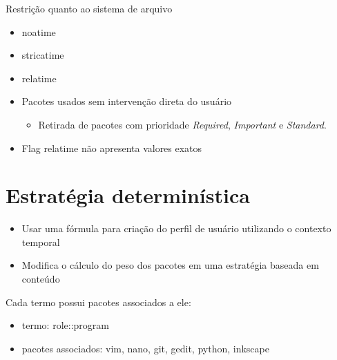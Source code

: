 \begin{frame}
    Restrição quanto ao sistema de arquivo

    \begin{itemize}
        \item noatime
        \item stricatime
        \item relatime
    \end{itemize}
\end{frame}

\begin{frame}

    \begin{itemize}
        \item Pacotes usados sem intervenção direta do usuário
            \begin{itemize}
                \item Retirada de pacotes com prioridade \textit{Required},
                      \textit{Important} e \textit{Standard}.
            \end{itemize}
        \item Flag relatime não apresenta valores exatos
    \end{itemize}

\end{frame}

\section{Estratégia determinística} %
\label{sec:estrategia_deterministica}

\begin{frame}
\begin{itemize}
    \item Usar uma fórmula para criação do perfil de usuário utilizando
    o contexto temporal
    \item Modifica o cálculo do peso dos pacotes em uma estratégia
    baseada em conteúdo
\end{itemize}
\end{frame}

\begin{frame}
    Cada termo possui pacotes associados a ele:
    \begin{itemize}
        \item termo: role::program
        \item pacotes associados: vim, nano, git, gedit, python, inkscape
    \end{itemize}
\end{frame}


